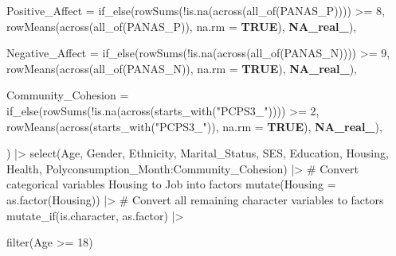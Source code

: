 \documentclass[
  bookmarksnumbered]{article}
\newenvironment{Shaded}{\begin{snugshade}}{\end{snugshade}}
\newcommand{\AttributeTok}[1]{\textcolor[rgb]{0.80,0.80,0.80}{#1}}
\newcommand{\CommentTok}[1]{\textcolor[rgb]{0.50,0.62,0.50}{#1}}
\newcommand{\ConstantTok}[1]{\textcolor[rgb]{0.86,0.64,0.64}{\textbf{#1}}}
\newcommand{\DecValTok}[1]{\textcolor[rgb]{0.86,0.86,0.80}{#1}}
\newcommand{\FunctionTok}[1]{\textcolor[rgb]{0.94,0.94,0.56}{#1}}
\newcommand{\NormalTok}[1]{\textcolor[rgb]{0.80,0.80,0.80}{#1}}
\newcommand{\SpecialCharTok}[1]{\textcolor[rgb]{0.86,0.64,0.64}{#1}}
\newcommand{\StringTok}[1]{\textcolor[rgb]{0.80,0.58,0.58}{#1}}
\begin{document}
\begin{Shaded}
\begin{Highlighting}[]
    \AttributeTok{Positive\_Affect =} \FunctionTok{if\_else}\NormalTok{(}\FunctionTok{rowSums}\NormalTok{(}\SpecialCharTok{!}\FunctionTok{is.na}\NormalTok{(}\FunctionTok{across}\NormalTok{(}\FunctionTok{all\_of}\NormalTok{(PANAS\_P)))) }\SpecialCharTok{\textgreater{}=} \DecValTok{8}\NormalTok{,}
                              \FunctionTok{rowMeans}\NormalTok{(}\FunctionTok{across}\NormalTok{(}\FunctionTok{all\_of}\NormalTok{(PANAS\_P)), }\AttributeTok{na.rm =} \ConstantTok{TRUE}\NormalTok{),}
                              \ConstantTok{NA\_real\_}\NormalTok{),}
    
    \AttributeTok{Negative\_Affect =} \FunctionTok{if\_else}\NormalTok{(}\FunctionTok{rowSums}\NormalTok{(}\SpecialCharTok{!}\FunctionTok{is.na}\NormalTok{(}\FunctionTok{across}\NormalTok{(}\FunctionTok{all\_of}\NormalTok{(PANAS\_N)))) }\SpecialCharTok{\textgreater{}=} \DecValTok{9}\NormalTok{,}
                              \FunctionTok{rowMeans}\NormalTok{(}\FunctionTok{across}\NormalTok{(}\FunctionTok{all\_of}\NormalTok{(PANAS\_N)), }\AttributeTok{na.rm =} \ConstantTok{TRUE}\NormalTok{),}
                              \ConstantTok{NA\_real\_}\NormalTok{),                          }
    
    \AttributeTok{Community\_Cohesion =} \FunctionTok{if\_else}\NormalTok{(}\FunctionTok{rowSums}\NormalTok{(}\SpecialCharTok{!}\FunctionTok{is.na}\NormalTok{(}\FunctionTok{across}\NormalTok{(}\FunctionTok{starts\_with}\NormalTok{(}\StringTok{"PCPS3\_"}\NormalTok{)))) }\SpecialCharTok{\textgreater{}=} \DecValTok{2}\NormalTok{,}
                                 \FunctionTok{rowMeans}\NormalTok{(}\FunctionTok{across}\NormalTok{(}\FunctionTok{starts\_with}\NormalTok{(}\StringTok{"PCPS3\_"}\NormalTok{)), }\AttributeTok{na.rm =} \ConstantTok{TRUE}\NormalTok{),}
                                 \ConstantTok{NA\_real\_}\NormalTok{),}
    
\NormalTok{  ) }\SpecialCharTok{|\textgreater{}}
  \FunctionTok{select}\NormalTok{(Age, Gender, Ethnicity, Marital\_Status, SES, Education, Housing, }
\NormalTok{         Health, Polyconsumption\_Month}\SpecialCharTok{:}\NormalTok{Community\_Cohesion) }\SpecialCharTok{|\textgreater{}}
  \CommentTok{\# Convert categorical variables Housing to Job into factors}
  \FunctionTok{mutate}\NormalTok{(}\AttributeTok{Housing =} \FunctionTok{as.factor}\NormalTok{(Housing)) }\SpecialCharTok{|\textgreater{}}
  \CommentTok{\# Convert all remaining character variables to factors}
  \FunctionTok{mutate\_if}\NormalTok{(is.character, as.factor) }\SpecialCharTok{|\textgreater{}} 
  
  \FunctionTok{filter}\NormalTok{(Age }\SpecialCharTok{\textgreater{}=} \DecValTok{18}\NormalTok{)}
\end{Highlighting}
\end{Shaded}
\end{document}
